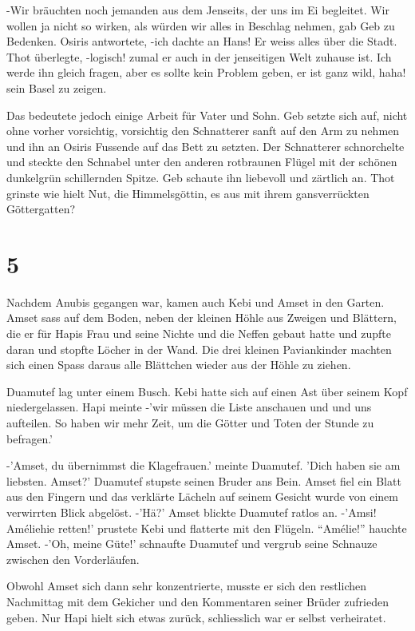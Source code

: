 \documentclass[11pt,titlepage,a5paper]{book}
\begin{document}
-Wir bräuchten noch jemanden aus dem Jenseits, der uns im Ei begleitet. Wir wollen ja nicht so wirken, als würden wir alles in Beschlag nehmen, gab Geb zu Bedenken. Osiris antwortete, -ich dachte an Hans! Er weiss alles über die Stadt. Thot überlegte, -logisch! zumal er auch in der jenseitigen Welt zuhause ist. Ich werde ihn gleich fragen, aber es sollte kein Problem geben, er ist ganz wild, haha! sein Basel zu zeigen.

Das bedeutete jedoch einige Arbeit für Vater und Sohn. Geb setzte sich auf, nicht ohne vorher vorsichtig, vorsichtig den Schnatterer sanft auf den Arm zu nehmen und ihn an Osiris Fussende auf das Bett zu setzten. Der Schnatterer schnorchelte und steckte den Schnabel unter den anderen rotbraunen Flügel mit der schönen dunkelgrün schillernden Spitze. Geb schaute ihn liebevoll und zärtlich an. Thot grinste wie hielt Nut, die Himmelsgöttin, es aus mit ihrem gansverrückten Göttergatten? 

\section*{5}

Nachdem Anubis gegangen war, kamen auch Kebi und Amset in den Garten. Amset sass auf dem Boden, neben der kleinen Höhle aus Zweigen und Blättern, die er für Hapis Frau und seine Nichte und die Neffen gebaut hatte und zupfte daran und stopfte Löcher in der Wand. Die drei kleinen Paviankinder machten sich einen Spass daraus alle Blättchen wieder aus der Höhle zu ziehen. 

Duamutef lag unter einem Busch. Kebi hatte sich auf einen Ast über seinem Kopf niedergelassen. Hapi meinte -'wir müssen die Liste anschauen und und uns aufteilen. So haben wir mehr Zeit, um die Götter und Toten der Stunde zu befragen.'

-'Amset, du übernimmst die Klagefrauen.' meinte Duamutef. 'Dich haben sie am liebsten. Amset?' Duamutef stupste seinen Bruder ans Bein. Amset fiel ein Blatt aus den Fingern und das verklärte Lächeln auf seinem Gesicht wurde von einem verwirrten Blick abgelöst. -'Hä?' Amset blickte Duamutef ratlos an. -'Amsi! Améliehie retten!' prustete Kebi und flatterte mit den Flügeln. "`Amélie!"' hauchte Amset. -'Oh, meine Güte!' schnaufte Duamutef und vergrub seine Schnauze zwischen den Vorderläufen. 

Obwohl Amset sich dann sehr konzentrierte, musste er sich den restlichen Nachmittag mit dem Gekicher und den Kommentaren seiner Brüder zufrieden geben. Nur Hapi hielt sich etwas zurück, schliesslich war er selbst verheiratet. 
\end{document}
